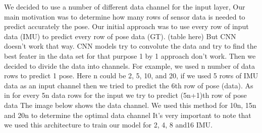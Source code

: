 We decided to use a number of different data channel for the input layer, Our main motivation was to determine how many rows of sensor data is needed to predict accurately the pose. Our initial approach was to use every row of input data (IMU) to predict every row of pose data (GT).
(table here)
But CNN doesn’t work that way. CNN models try to convolute the data and try to find the best feater in the data set for that purpose 1 by 1 approach don’t work. Then we decided to divide the data into channels. For example, we used n number of data rows to predict 1 pose. Here n could be 2, 5, 10, and 20, if we used 5 rows of IMU data as an input channel then we tried to predict the 6th row of pose (data).  As in for every 5n data rows for the input we try to predict (5n+1)th row of pose data
The image below shows the data channel. We used this method for 10n, 15n and 20n to determine the optimal data channel
It's very important to note that we used this architecture to train our model for 2, 4, 8 and16  IMU.